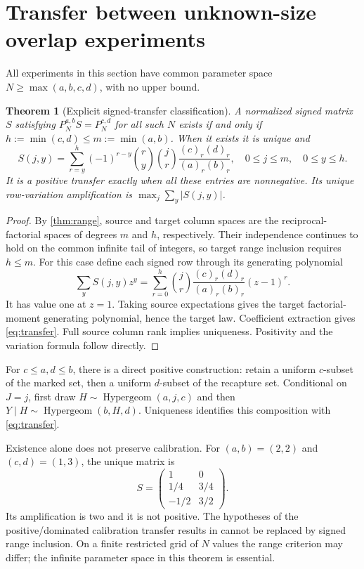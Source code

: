 \documentclass[11pt]{article}
\newtheorem{theorem}{Theorem}[section]
\theoremstyle{remark}\newtheorem{remark}[theorem]{Remark}
\newcommand{\fall}[2]{(#1)_{#2}}\newcommand{\rise}[2]{(#1)^{\overline{#2}}}
\begin{document}
\section{Transfer between unknown-size overlap experiments}
All experiments in this section have common parameter space
$N\ge\max(a,b,c,d)$, with no upper bound.
\begin{theorem}[Explicit signed-transfer classification]\label{thm:transfer}
A normalized signed matrix $S$ satisfying
$P_N^{a,b}S=P_N^{c,d}$ for all such $N$ exists if and only if
$h:=\min(c,d)\le m:=\min(a,b)$. When it exists it is unique and
\begin{equation}\label{eq:transfer}
 S(j,y)=\sum_{r=y}^{h}(-1)^{r-y}\binom ry\binom jr
 \frac{\fall{c}{r}\fall{d}{r}}{\fall{a}{r}\fall{b}{r}},
 \quad 0\le j\le m,\quad0\le y\le h.
\end{equation}
It is a positive transfer exactly when all these entries are nonnegative.
Its unique row-variation amplification is $\max_j\sum_y|S(j,y)|$.
\end{theorem}
\begin{proof}
By \cref{thm:range}, source and target column spaces are the reciprocal-
factorial spaces of degrees $m$ and $h$, respectively. Their independence
continues to hold on the common infinite tail of integers, so target range
inclusion requires $h\le m$.
For this case define each signed row through its generating polynomial
\[
 \sum_y S(j,y)z^y=
 \sum_{r=0}^h\binom jr
 \frac{\fall{c}{r}\fall{d}{r}}{\fall{a}{r}\fall{b}{r}}(z-1)^r.
\]
It has value one at $z=1$. Taking source expectations gives the target
factorial-moment generating polynomial, hence the target law.
Coefficient extraction gives \eqref{eq:transfer}. Full source column rank
implies uniqueness. Positivity and the variation formula follow directly.
\end{proof}
For $c\le a,d\le b$, there is a direct positive construction: retain a
uniform $c$-subset of the marked set, then a uniform $d$-subset of the
recapture set. Conditional on $J=j$, first draw
$H\sim\operatorname{Hypergeom}(a,j,c)$ and then
$Y\mid H\sim\operatorname{Hypergeom}(b,H,d)$. Uniqueness identifies this
composition with \eqref{eq:transfer}.

Existence alone does not preserve calibration. For $(a,b)=(2,2)$ and
$(c,d)=(1,3)$, the unique matrix is
\[
 S=\begin{pmatrix}1&0\\1/4&3/4\\-1/2&3/2\end{pmatrix}.
\]
Its amplification is two and it is not positive. The hypotheses of the
positive/dominated calibration transfer results in \cite{LongTransfer}
cannot be replaced by signed range inclusion. On a finite restricted grid
of $N$ values the range criterion may differ; the infinite parameter space
in this theorem is essential.
\end{document}

